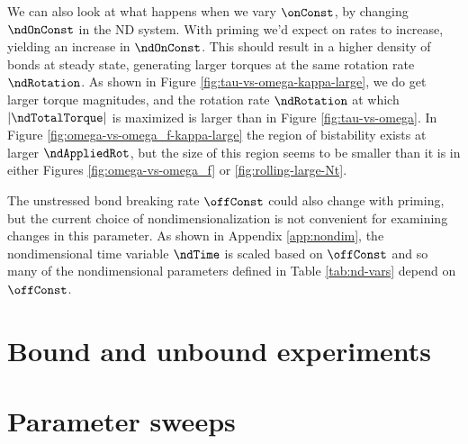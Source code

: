 We can also look at what happens when we vary $\onConst$, by changing
$\ndOnConst$ in the ND system. With priming we'd expect on rates to
increase, yielding an increase in $\ndOnConst$. This should result in
a higher density of bonds at steady state, generating larger torques
at the same rotation rate $\ndRotation$. As shown in Figure
\ref{fig:tau-vs-omega-kappa-large}, we do get larger torque
magnitudes, and the rotation rate $\ndRotation$ at which
$|\ndTotalTorque|$ is maximized is larger than in Figure
\ref{fig:tau-vs-omega}. In Figure
\ref{fig:omega-vs-omega_f-kappa-large} the region of bistability
exists at larger $\ndAppliedRot$, but the size of this region seems to
be smaller than it is in either Figures \ref{fig:omega-vs-omega_f} or
\ref{fig:rolling-large-Nt}.

The unstressed bond breaking rate $\offConst$ could also change with
priming, but the current choice of nondimensionalization is not
convenient for examining changes in this parameter. As shown in
Appendix \ref{app:nondim}, the nondimensional time variable $\ndTime$
is scaled based on $\offConst$ and so many of the nondimensional
parameters defined in Table \ref{tab:nd-vars} depend on $\offConst$.

\section{Bound and unbound experiments}
\label{sec:bound-unbo-exper}

\section{Parameter sweeps}
\label{sec:parameter-sweeps}

